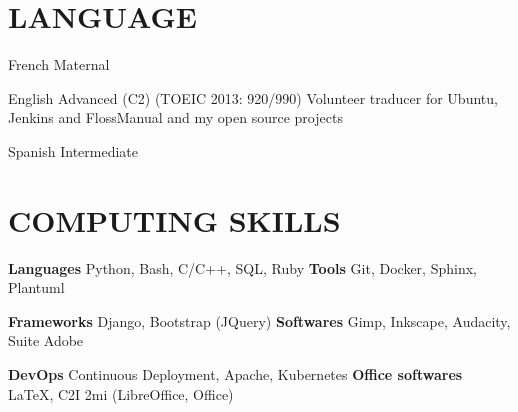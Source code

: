 \documentclass[11pt,a4paper]{moderncv}
\begin{document}



  \section{LANGUAGE}

  \cvlanguage
    {French}
    {Maternal}{}{}{}{}

  \cvlanguage
    {English}
    {Advanced (C2) (TOEIC 2013: 920/990)}
    {Volunteer traducer for Ubuntu, Jenkins and FlossManual and my open source projects}

  \cvlanguage
    {Spanish}
    {Intermediate}
    {}{}{}{}

  \section{COMPUTING SKILLS}

  \cvcomputer
    {\textbf{Languages}}
    {Python, Bash, C/C++, SQL, Ruby}
    {\textbf{Tools}}
    {Git, Docker, Sphinx, Plantuml}

  \cvcomputer
    {\textbf{Frameworks}}
    {Django, Bootstrap (JQuery)}
    {\textbf{Softwares}}
    {Gimp, Inkscape, Audacity, Suite Adobe}

  \cvcomputer
    {\textbf{DevOps}}
    {Continuous Deployment, Apache, Kubernetes}
    {\textbf{Office softwares}}
    {\LaTeX{}, C2I 2mi (LibreOffice, Office)}
\end{document}
